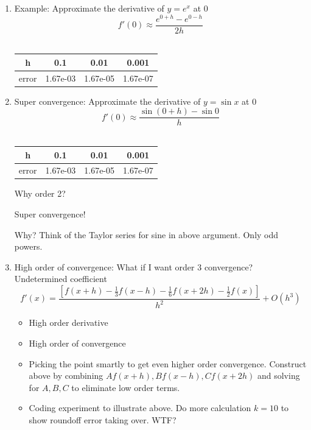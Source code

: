 \documentclass{article}
\theoremstyle{remark}
\begin{document}
\begin{enumerate}
\begin{enumerate}
\item Example: Approximate the derivative of $y = e^x$ at $0$
$$
f'(0) \approx \frac{e^{0+h}-e^{0-h}}{2h}
$$\\
\begin{center}
\begin{tabular}{|c|c|c|c|}
\hline
h & 0.1 & 0.01& 0.001\\\hline
error & 1.67e-03 & 1.67e-05 & 1.67e-07\\\hline
\end{tabular}
\end{center}

\item Super convergence: Approximate the derivative of $y = \sin x$ at $0$
$$
f'(0) \approx \frac{\sin (0+h)-\sin 0}{h}
$$\\
\begin{center}
\begin{tabular}{|c|c|c|c|}
\hline
h & 0.1 & 0.01& 0.001\\\hline
error & 1.67e-03 & 1.67e-05 & 1.67e-07\\\hline
\end{tabular}
\end{center}
Why order 2?

\begin{center}
Super convergence! 
\end{center}
Why? Think of the Taylor series for sine in above argument. Only odd powers.

\item High order of convergence: What if I want order $3$ convergence?\\[0.1in]
Undetermined coefficient
$$
f'(x) = \frac{[f(x+h)-\frac{1}{3}f(x-h)-\frac{1}{6}f(x+2h)-\frac{1}{2}f(x)]}{h^2} +O(h^3)
$$
\begin{itemize}
\item High order derivative
\item High order of convergence
\item Picking the point smartly to get even higher order convergence. Construct above by combining $A f(x+h),B f(x-h),C f(x+2h)$ and solving for $A,B,C$ to eliminate low order terms.
\item Coding experiment to illustrate above. Do  more calculation $k=10$ to show roundoff error taking over. WTF?
\end{itemize}


\end{enumerate}
\end{enumerate}
\end{document}
